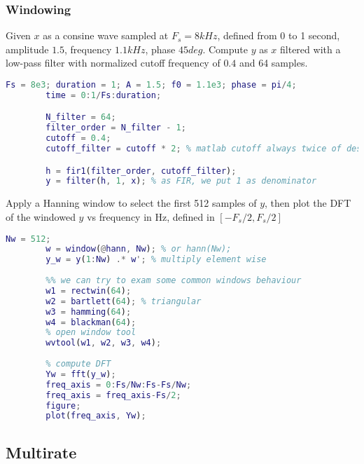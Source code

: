     \subsubsection{Windowing}
    Given $x$ as a consine wave sampled at $F_s=8kHz$, defined from 0 to 1 second, amplitude $1.5$, frequency $1.1kHz$, phase $45 deg$. Compute $y$ as $x$ filtered with a low-pass filter with normalized cutoff frequency of $0.4$ and 64 samples.
    \begin{lstlisting}[language=Matlab, escapeinside=`']
        Fs = 8e3; duration = 1; A = 1.5; f0 = 1.1e3; phase = pi/4;
        time = 0:1/Fs:duration;

        N_filter = 64;
        filter_order = N_filter - 1;
        cutoff = 0.4;
        cutoff_filter = cutoff * 2; % matlab cutoff always twice of desired

        h = fir1(filter_order, cutoff_filter);
        y = filter(h, 1, x); % as FIR, we put 1 as denominator
    \end{lstlisting}
    Apply a Hanning window to select the first 512 samples of $y$, then plot the DFT of the windowed $y$ vs frequency in Hz, defined in $[-F_s/2,F_s/2]$
    \begin{lstlisting}[language=Matlab, escapeinside=`']
        Nw = 512;
        w = window(@hann, Nw); % or hann(Nw);
        y_w = y(1:Nw) .* w'; % multiply element wise
        
        %% we can try to exam some common windows behaviour
        w1 = rectwin(64);
        w2 = bartlett(64); % triangular
        w3 = hamming(64);
        w4 = blackman(64);
        % open window tool
        wvtool(w1, w2, w3, w4);
        
        % compute DFT
        Yw = fft(y_w);
        freq_axis = 0:Fs/Nw:Fs-Fs/Nw;
        freq_axis = freq_axis-Fs/2;
        figure;
        plot(freq_axis, Yw);
    \end{lstlisting}
    
\pagebreak\subsection{Multirate}
